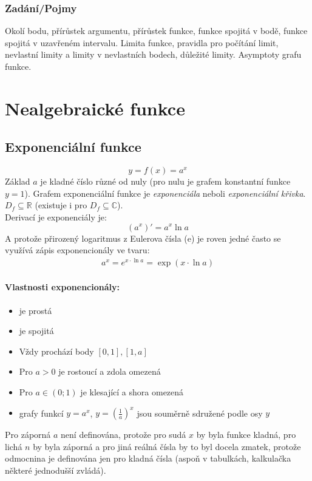 \documentclass[12pt]{article}
\newcommand{\euler}{\mathrm{e}} %
\newcommand{\nR}{\mathbb{R}} %
\newcommand{\nC}{\mathbb{C}} %
\begin{document}
\subsubsection{Zadání/Pojmy}
Okolí bodu, přírůstek argumentu, přírůstek funkce, funkce spojitá v bodě, funkce spojitá v uzavřeném intervalu. Limita funkce, pravidla pro počítání limit, nevlastní limity a limity v nevlastních bodech, důležité limity. Asymptoty grafu funkce.

\section{Nealgebraické funkce}
\subsection{Exponenciální funkce}
\begin{equation}
y =f(x) = a^x
\end{equation}
Základ $a$ je kladné číslo různé od nuly (pro nulu je grafem konstantní funkce $y=1$). Grafem exponenciální funkce je \emph{exponenciála} neboli \emph{exponenciální křivka}. $D_f \subseteq \nR$ (existuje i pro $D_f \subseteq \nC$).\\
Derivací je exponenciály je:
\begin{equation}
(a^x)' = a^x \ln a
\end{equation}
A protože přirozený logaritmus z Eulerova čísla ($\euler$) je roven jedné často se využívá zápis exponencionály ve tvaru:
\begin{align}
a^x = e^{x \cdot \ln{a}} = \exp{(x \cdot \ln{a})}
\end{align}
\paragraph{Vlastnosti exponencionály:}
\begin{itemize}
\item je prostá
\item je spojitá
\item Vždy prochází body $[0,1], [1,a]$
\item Pro $a>0$ je rostoucí a zdola omezená
\item Pro $a \in (0;1)$ je klesající a shora omezená
\item grafy funkcí $y=a^x$, $y= \left( \frac{1}{a} \right)^{x}$ jsou souměrně sdružené podle osy $y$
\end{itemize}
Pro záporná $a$ není definována, protože pro sudá $x$ by byla funkce kladná, pro lichá $n$ by byla záporná a pro jiná reálná čísla by to byl docela zmatek, protože odmocnina je definována jen pro kladná čísla (aspoň v tabulkách, kalkulačka některé jednodušší zvládá).
\end{document}

